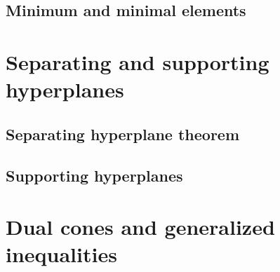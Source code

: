 \subsection{Minimum and minimal elements}
\begin{example}
\end{example}
\begin{example}
\end{example}

\section{Separating and supporting hyperplanes}

\subsection{Separating hyperplane theorem}
\begin{example}
\end{example}
\begin{example}
\end{example}
\begin{example}
\end{example}

\subsection{Supporting hyperplanes}

\section{Dual cones and generalized inequalities}

